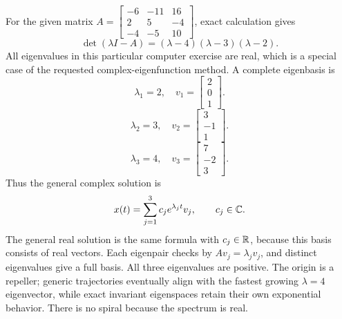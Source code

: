 For the given matrix $A=\left[\begin{matrix}-6 & -11 & 16\\2 & 5 & -4\\-4 & -5 & 10\end{matrix}\right]$, exact calculation gives
\[\det(\lambda I-A)=\left(\lambda - 4\right) \left(\lambda - 3\right) \left(\lambda - 2\right).\]
All eigenvalues in this particular computer exercise are real,
which is a special case of the requested complex-eigenfunction method.
A complete eigenbasis is
\[\lambda_1=2,\quad v_1=\left[\begin{matrix}2\\0\\1\end{matrix}\right].\]
\[\lambda_2=3,\quad v_2=\left[\begin{matrix}3\\-1\\1\end{matrix}\right].\]
\[\lambda_3=4,\quad v_3=\left[\begin{matrix}7\\-2\\3\end{matrix}\right].\]
Thus the general complex solution is
\[x(t)=\sum_{j=1}^3 c_j e^{\lambda_jt}v_j,\qquad c_j\in\mathbb{C}.\]
The general real solution is the same formula with $c_j\in\mathbb{R}$,
because this basis consists of real vectors. Each eigenpair checks by
$Av_j=\lambda_jv_j$, and distinct eigenvalues give a full basis.
All three eigenvalues are positive. The origin is a repeller;
generic trajectories eventually align with the fastest growing
$\lambda=4$ eigenvector, while exact invariant eigenspaces retain
their own exponential behavior. There is no spiral because the
spectrum is real.

